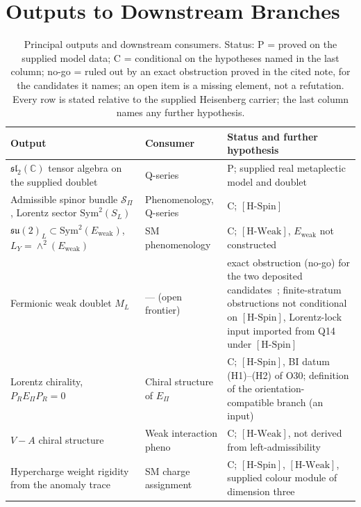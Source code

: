 \documentclass[11pt,a4paper]{article}
\theoremstyle{definition}
\newcommand{\su}{\mathfrak{su}}
\newcommand{\Sbundle}{\mathcal{S}_\Pi}
\newcommand{\Epi}{E_\Pi}
\newcommand{\Ew}{E_{\mathrm{weak}}}
\newcommand{\HSpin}{\ensuremath{[\mathrm{H\text{-}Spin}]}}
\newcommand{\HWeak}{\ensuremath{[\mathrm{H\text{-}Weak}]}}
\begin{document}
  \section{Outputs to Downstream Branches}
    \label{sec:outputs}

      \renewcommand{\arraystretch}{1.3}
      \begin{longtable}[c]{@{}>{\raggedright\arraybackslash}p{4.6cm}
         >{\raggedright\arraybackslash}p{3.6cm}>{\raggedright\arraybackslash}p{4.6cm}@{}}
        \caption{Principal outputs and downstream consumers.
      Status: P = proved on the supplied model data; C = conditional on the hypotheses named in the last column;
      no-go = ruled out by an exact obstruction proved in the cited note, for the candidates it names;
        an open item is a missing element, not a refutation.
      Every row is stated relative to the supplied Heisenberg carrier; the last column names any
      further hypothesis.}
      \label{tab:outputs}\\
          \toprule
        Output & Consumer & Status and further hypothesis \\
        \midrule
        $\mathfrak{sl}_2(\mathbb{C})$ tensor algebra on the supplied doublet
          & Q-series
          & P; supplied real metaplectic model and doublet \\
        Admissible spinor bundle $\Sbundle$, Lorentz sector $\mathrm{Sym}^2(S_L)$
          & Phenomenology, Q-series
          & C; \HSpin{} \\
        $\su(2)_L \subset \mathrm{Sym}^2(\Ew)$, $L_Y = \wedge^2(\Ew)$
          & SM phenomenology
          & C; \HWeak{}, $\Ew$ not constructed \\
        Fermionic weak doublet $M_L$
          & --- (open frontier)
          & exact obstruction (no-go) for the two deposited candidates~\cite{Beau2026nsr}; finite-stratum obstructions
            not conditional on \HSpin{}, Lorentz-lock input imported from Q14 under \HSpin{} \\
        Lorentz chirality, $P_R \Epi P_R = 0$
          & Chiral structure of $\Epi$
          & C; \HSpin{}, BI datum (H1)--(H2) of O30; definition of the orientation-compatible branch (an input) \\
        $V-A$ chiral structure & Weak interaction pheno & C; \HWeak{}, not derived from left-admissibility \\
        Hypercharge weight rigidity from the anomaly trace
          & SM charge assignment
          & C; \HSpin{}, \HWeak{}, supplied colour module of dimension three \\

\end{longtable}
\end{document}
